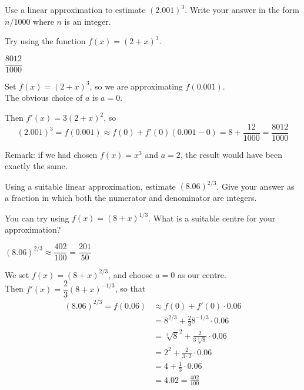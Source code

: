 \begin{question}[2007H]
 Use a linear approximation to estimate $(2.001)^3$.
Write your answer in the form $n/1000$ where $n$ is an integer.
\end{question}
\begin{hint}
Try using the function $f(x)=(2+x)^3$.
\end{hint}
\begin{answer} $\dfrac{8012}{1000}$
\end{answer}
\begin{solution}
Set $f(x)=(2+x)^3$, so we are approximating $f(0.001)$. \\
The obvious choice of $a$ is $a=0$.

 Then $f'(x)=3(2+x)^2$, so
$$
(2.001)^3=f(0.001)\approx f(0)+f'(0)(0.001-0)
=8+\frac{12}{1000}=\frac{8012}{1000}
$$

Remark: if we had chosen $f(x)=x^3$ and $a=2$, the result would have been exactly the same.
\end{solution}


\begin{question}[2006H]
Using a suitable linear approximation, estimate
$(8.06)^{2/3}$. Give your answer as a fraction in which both the
numerator and denominator are integers.
\end{question}
\begin{hint}
You can try using $f(x)=(8+x)^{1/3}$. What is a suitable centre for your approximation?
\end{hint}
\begin{answer}
$(8.06)^{2/3}\approx\dfrac{402}{100}=\dfrac{201}{50}$
\end{answer}
\begin{solution}
We set $f(x)=(8+x)^{2/3}$, and choose $a=0$ as our centre.\\
Then $f'(x)=\dfrac{2}{3}(8+x)^{-1/3}$, so that
\begin{align*}
(8.06)^{2/3}=f(0.06)&\approx f(0)+f'(0)\cdot 0.06\\
&=8^{2/3}+\frac{2}{3}8^{-1/3}\cdot 0.06\\
&=\sqrt[3]{8}^2+\frac{2}{3\sqrt[3]{8}}\cdot 0.06\\
&=2^2+\frac{2}{3\cdot 2}\cdot 0.06\\
&=4+\frac{1}{3}\cdot 0.06\\&=4.02=\frac{402}{100}\end{align*}
\end{solution}


